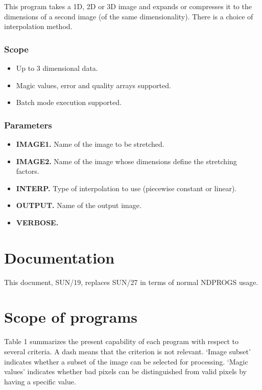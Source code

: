 This program takes a 1D, 2D or 3D image and expands or compresses it to the
dimensions of a second image (of the same dimensionality). There is a choice of
interpolation method.

\subsubsection{Scope}

\begin{itemize}
\item Up to 3 dimensional data. 
\item Magic values, error and quality arrays supported.
\item Batch mode execution supported.
\end {itemize}

\subsubsection{Parameters}

\begin{itemize}
\item {\bf IMAGE1.} Name of the image to be stretched.
\item {\bf IMAGE2.} Name of the image whose dimensions define the stretching
factors.
\item {\bf INTERP.} Type of interpolation to use (piecewise constant or
linear).
\item {\bf OUTPUT.} Name of the output image.
\item {\bf VERBOSE.}
\end{itemize}

\section{Documentation{}}
\label{sec:documentation}

This document, SUN/19, replaces SUN/27 in terms of normal NDPROGS usage. 

\section{Scope of programs{}}
\label{sec:scope}

Table 1 summarizes the present capability of each program with respect 
to several criteria. A dash means that the criterion is not relevant.
`Image subset' indicates whether a subset of the image can be selected for 
processing. `Magic values' indicates whether bad pixels can be distinguished
from valid pixels by having a specific value.    

